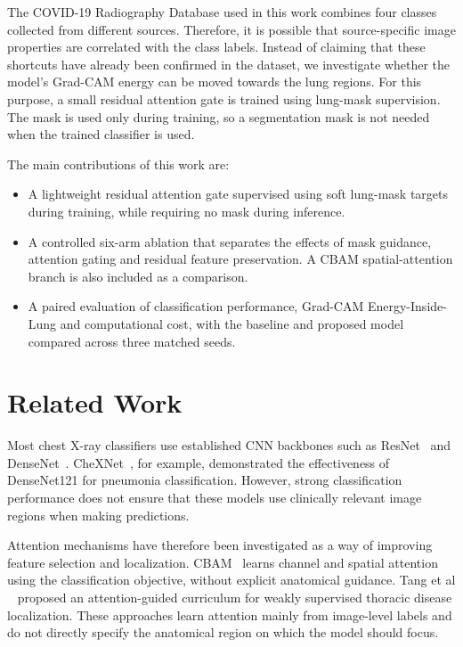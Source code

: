 \documentclass[sigconf,screen,nonacm]{acmart}
\begin{document}
The COVID-19 Radiography Database used in this work combines four classes collected from different sources. Therefore, it is possible that source-specific image properties are correlated with the class labels. Instead of claiming that these shortcuts have already been confirmed in the dataset, we investigate whether the model's Grad-CAM energy \cite{selvaraju2017gradcam} can be moved towards the lung regions. For this purpose, a small residual attention gate is trained using lung-mask supervision. The mask is used only during training, so a segmentation mask is not needed when the trained classifier is used.

The main contributions of this work are:

\begin{itemize}
\item A lightweight residual attention gate supervised using soft lung-mask targets during training, while requiring no mask during inference.

\item A controlled six-arm ablation that separates the effects of mask guidance, attention gating and residual feature preservation. A CBAM spatial-attention branch is also included as a comparison.

\item A paired evaluation of classification performance, Grad-CAM Energy-Inside-Lung and computational cost, with the baseline and proposed model compared across three matched seeds.


\end{itemize}

\section{Related Work}
Most chest X-ray classifiers use established CNN backbones such as ResNet~\cite{he2016resnet} and DenseNet~\cite{huang2017densenet}. CheXNet~\cite{rajpurkar2017chexnet}, for example, demonstrated the effectiveness of DenseNet121 for pneumonia classification. However, strong classification performance does not ensure that these models use clinically relevant image regions when making predictions.

Attention mechanisms have therefore been investigated as a way of improving feature selection and localization. CBAM~\cite{woo2018cbam} learns channel and spatial attention using the classification objective, without explicit anatomical guidance. Tang et al ~\cite{tang2018attention} proposed an attention-guided curriculum for weakly supervised thoracic disease localization. These approaches learn attention mainly from image-level labels and do not directly specify the anatomical region on which the model should focus.
\end{document}
